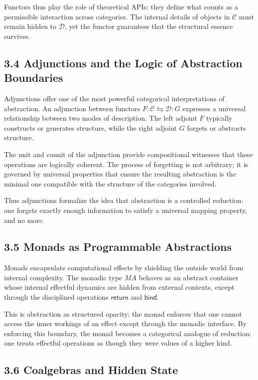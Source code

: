 \documentclass[12pt,letterpaper]{article}
\begin{document}
Functors thus play the role of theoretical APIs: they define what counts as a permissible interaction across categories. The internal details of objects in \(\mathcal{C}\) must remain hidden to \(\mathcal{D}\), yet the functor guarantees that the structural essence survives.

\subsection{3.4 Adjunctions and the Logic of Abstraction Boundaries}

Adjunctions offer one of the most powerful categorical interpretations of abstraction. An adjunction between functors \(F : \mathcal{C} \leftrightarrows \mathcal{D} : G\) expresses a universal relationship between two modes of description. The left adjoint \(F\) typically constructs or generates structure, while the right adjoint \(G\) forgets or abstracts structure.

The unit and counit of the adjunction provide compositional witnesses that these operations are logically coherent. The process of forgetting is not arbitrary; it is governed by universal properties that ensure the resulting abstraction is the minimal one compatible with the structure of the categories involved.

Thus adjunctions formalize the idea that abstraction is a controlled reduction: one forgets exactly enough information to satisfy a universal mapping property, and no more.

\subsection{3.5 Monads as Programmable Abstractions}

Monads encapsulate computational effects by shielding the outside world from internal complexity. The monadic type \(M A\) behaves as an abstract container whose internal effectful dynamics are hidden from external contexts, except through the disciplined operations \(\mathsf{return}\) and \(\mathsf{bind}\).

This is abstraction as structured opacity: the monad enforces that one cannot access the inner workings of an effect except through the monadic interface. By enforcing this boundary, the monad becomes a categorical analogue of reduction: one treats effectful operations as though they were values of a higher kind.

\subsection{3.6 Coalgebras and Hidden State}
\end{document}
